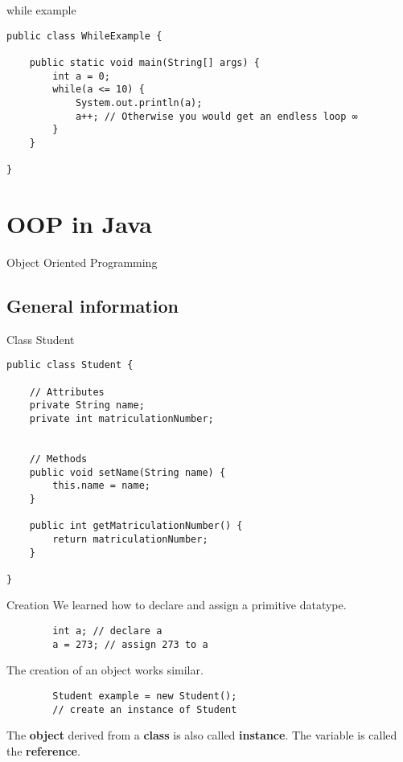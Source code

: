 \begin{frame}[fragile]{while example}
\begin{lstlisting}
public class WhileExample {

	public static void main(String[] args) {
		int a = 0;
		while(a <= 10) {
			System.out.println(a);
            a++; // Otherwise you would get an endless loop ∞
		}
	}
    
}
\end{lstlisting}
\end{frame}


\section{OOP in Java}

\begin{frame}{}
	\begin{center}
		{\huge Object Oriented Programming}
	\end{center}
\end{frame}

\subsection{General information}

\begin{frame}[fragile]{Class Student}
\begin{lstlisting}
public class Student {

	// Attributes
	private String name; 
	private int matriculationNumber; 
	
	
	// Methods
	public void setName(String name) {
		this.name = name;
	}
    
	public int getMatriculationNumber() {
		return matriculationNumber;
	}
    
}
\end{lstlisting}


\end{frame}

\begin{frame}[fragile]{Creation}
	We learned how to declare and assign a primitive datatype.
	
	\begin{lstlisting}
	    int a; // declare a
	    a = 273; // assign 273 to a
	\end{lstlisting} 
	
	The creation of an object works similar.
	
	\begin{lstlisting}
	    Student example = new Student(); 
		// create an instance of Student
	\end{lstlisting}
	The \textbf{object} derived from a \textbf{class} is also called \textbf{instance}.
	The variable is called the \textbf{reference}.
\end{frame}

